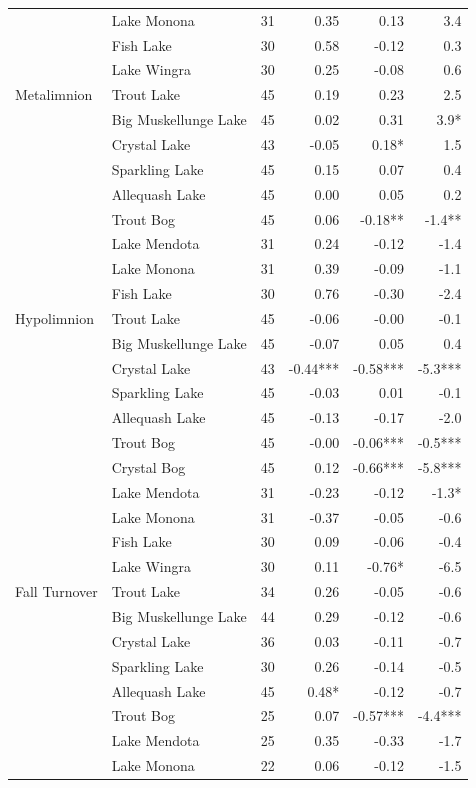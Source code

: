 \begin{table}[htbp]
{\begin{tabular}{llrrrr}
 & Lake Monona & 31 & 0.35 & 0.13 & 3.4 \\
 & Fish Lake & 30 & 0.58 & -0.12 & 0.3 \\
 & Lake Wingra & 30 & 0.25 & -0.08 & 0.6 \\
\hline
Metalimnion & Trout Lake & 45 & 0.19 & 0.23 & 2.5 \\
 & Big Muskellunge Lake & 45 & 0.02 & 0.31 & 3.9* \\
 & Crystal Lake & 43 & -0.05 & 0.18* & 1.5 \\
 & Sparkling Lake & 45 & 0.15 & 0.07 & 0.4 \\
 & Allequash Lake & 45 & 0.00 & 0.05 & 0.2 \\
 & Trout Bog & 45 & 0.06 & -0.18** & -1.4** \\
 & Lake Mendota & 31 & 0.24 & -0.12 & -1.4 \\
 & Lake Monona & 31 & 0.39 & -0.09 & -1.1 \\
 & Fish Lake & 30 & 0.76 & -0.30 & -2.4 \\
\hline
Hypolimnion & Trout Lake & 45 & -0.06 & -0.00 & -0.1 \\
 & Big Muskellunge Lake & 45 & -0.07 & 0.05 & 0.4 \\
 & Crystal Lake & 43 & -0.44*** & -0.58*** & -5.3*** \\
 & Sparkling Lake & 45 & -0.03 & 0.01 & -0.1 \\
 & Allequash Lake & 45 & -0.13 & -0.17 & -2.0 \\
 & Trout Bog & 45 & -0.00 & -0.06*** & -0.5*** \\
 & Crystal Bog & 45 & 0.12 & -0.66*** & -5.8*** \\
 & Lake Mendota & 31 & -0.23 & -0.12 & -1.3* \\
 & Lake Monona & 31 & -0.37 & -0.05 & -0.6 \\
 & Fish Lake & 30 & 0.09 & -0.06 & -0.4 \\
 & Lake Wingra & 30 & 0.11 & -0.76* & -6.5 \\
\hline
Fall Turnover & Trout Lake & 34 & 0.26 & -0.05 & -0.6 \\
 & Big Muskellunge Lake & 44 & 0.29 & -0.12 & -0.6 \\
 & Crystal Lake & 36 & 0.03 & -0.11 & -0.7 \\
 & Sparkling Lake & 30 & 0.26 & -0.14 & -0.5 \\
 & Allequash Lake & 45 & 0.48* & -0.12 & -0.7 \\
 & Trout Bog & 25 & 0.07 & -0.57*** & -4.4*** \\
 & Lake Mendota & 25 & 0.35 & -0.33 & -1.7 \\
 & Lake Monona & 22 & 0.06 & -0.12 & -1.5 \\
\bottomrule
\end{tabular}%
}
\end{table}
